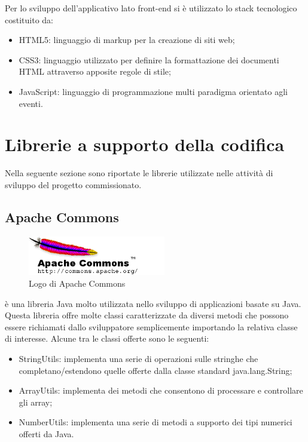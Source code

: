 \noindent Per lo sviluppo dell'applicativo lato front-end si è utilizzato lo stack tecnologico costituito da:
\begin{itemize}
\item HTML5: linguaggio di markup per la creazione di siti web;
\item CSS3: linguaggio utilizzato per definire la formattazione dei documenti HTML attraverso apposite regole di stile;
\item JavaScript: linguaggio di programmazione multi paradigma orientato agli eventi.
\end{itemize}

\pagebreak

\section{Librerie a supporto della codifica}
Nella seguente sezione sono riportate le librerie utilizzate nelle attività di sviluppo del progetto commissionato. 

\subsection{Apache Commons}

\begin{figure}[!h]
	\centering
	\includegraphics[width=6cm]{../images/Commons-logo.png}
	\caption{Logo di Apache Commons}
\end{figure}

\ap{{[b]}} è una libreria Java molto utilizzata nello sviluppo di applicazioni basate su Java. Questa libreria offre molte classi caratterizzate da diversi metodi che possono essere richiamati dallo sviluppatore semplicemente importando la relativa classe di interesse. Alcune tra le classi offerte sono le seguenti:
\begin{itemize}
\item StringUtils: implementa una serie di operazioni sulle stringhe che completano/estendono quelle offerte dalla classe standard java.lang.String;
\item ArrayUtils: implementa dei metodi che consentono di processare e controllare gli array; 
\item NumberUtils: implementa una serie di metodi a supporto dei tipi numerici offerti da Java.
\end{itemize} 

